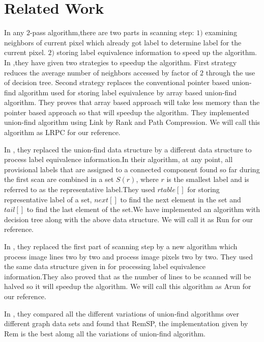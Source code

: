 \section{Related Work}
\label{sec:relatedworks}

In any $2$-pass algorithm,there are two parts in scanning step: $1)$ examining neighbors of current pixel which already
got label to determine label for the current pixel. $2)$ storing label equivalence information to speed up the algorithm. 
In \cite{Wu2009_LRPC},they have given two strategies to speedup the algorithm. First strategy reduces the average number
of neighbors accessed by factor of $2$ through the use of decision tree. Second strategy replaces the conventional pointer
based union-find algorithm used for storing label equivalence by array based union-find algorithm. They proves that array 
based approach will take less memory than the pointer based approach so that will speedup the algorithm. They implemented
union-find algorithm using Link by Rank and Path Compression. We will call this algorithm as LRPC for our reference.

In \cite{He2008_Run}, they replaced the union-find data structure by a different data structure to process label 
equivalence information.In their algorithm, at any point, all provisional labels that are assigned to a connected 
component found so far during the first scan are combined in a set $S(r)$, where $r$ is the smallest label and is 
referred to as the representative label.They used $rtable[]$ for storing representative label of a set, $next[]$ to 
find the next element in the set and $tail[]$ to find the last element of the set.We have implemented an algorithm 
with decision tree along with the above data structure. We will call it as Run for our reference.

In \cite{He2012_ARun}, they replaced the first part of scanning step by a new algorithm which process image lines two
by two and process image pixels two by two. They used the same data structure given in \cite{He2008_Run} for 
processing label equivalence information.They also proved that as the number of lines to be scanned will be halved so 
it will speedup the algorithm. We will call this algorithm as Arun for our reference.

In \cite{Patwary2010_RemSP}, they compared all the different variations of union-find algorithms over different graph 
data sets and found that RemSP, the implementation given by Rem is the best alomg all the variations of union-find 
algorithm.

